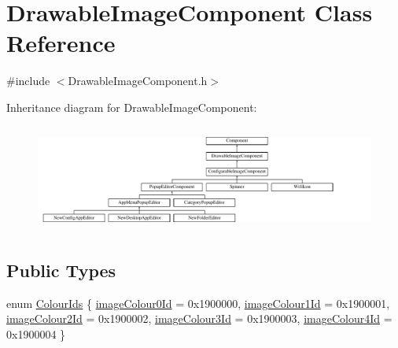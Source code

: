 \hypertarget{classDrawableImageComponent}{}\section{Drawable\+Image\+Component Class Reference}
\label{classDrawableImageComponent}


{\ttfamily \#include $<$Drawable\+Image\+Component.\+h$>$}

Inheritance diagram for Drawable\+Image\+Component\+:\begin{figure}[H]
\begin{center}
\leavevmode
\includegraphics[height=3.555556cm]{classDrawableImageComponent}
\end{center}
\end{figure}
\subsection*{Public Types}
\begin{DoxyCompactItemize}
\item 
enum \mbox{\hyperlink{classDrawableImageComponent_a6cca33c1e175b64cf506f71afd55bd31}{Colour\+Ids}} \{ \newline
\mbox{\hyperlink{classDrawableImageComponent_a6cca33c1e175b64cf506f71afd55bd31a34060f15a53802030e16fff023f4da00}{image\+Colour0\+Id}} = 0x1900000, 
\mbox{\hyperlink{classDrawableImageComponent_a6cca33c1e175b64cf506f71afd55bd31a5b9eb0a7d544c855c636373819a7ece5}{image\+Colour1\+Id}} = 0x1900001, 
\mbox{\hyperlink{classDrawableImageComponent_a6cca33c1e175b64cf506f71afd55bd31aab491d4816cb9587e509999207c09895}{image\+Colour2\+Id}} = 0x1900002, 
\mbox{\hyperlink{classDrawableImageComponent_a6cca33c1e175b64cf506f71afd55bd31a190df6ff234596d6879a0c552f5c874d}{image\+Colour3\+Id}} = 0x1900003, 
\newline
\mbox{\hyperlink{classDrawableImageComponent_a6cca33c1e175b64cf506f71afd55bd31ade4f2996583057034d29940335fdcd07}{image\+Colour4\+Id}} = 0x1900004
 \}
\end{DoxyCompactItemize}
